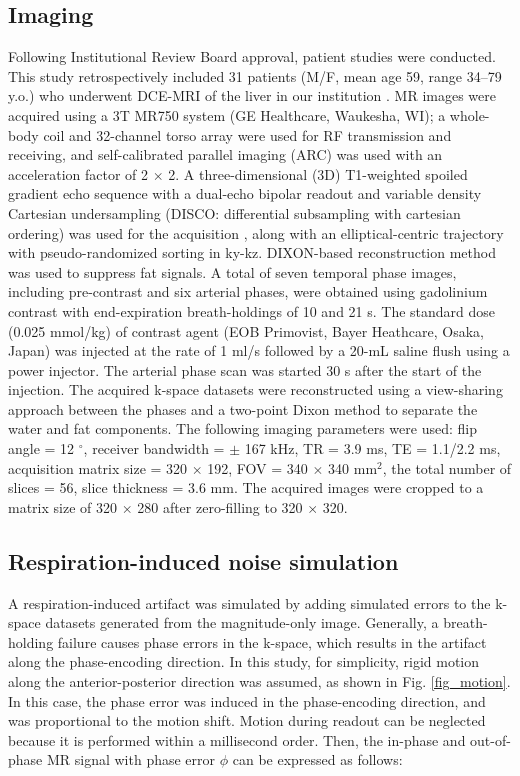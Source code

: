 \documentclass[num-refs]{wiley-article}
\begin{document}
\subsection{Imaging}

Following Institutional Review Board approval, patient studies were conducted. This study retrospectively included 31 patients (M/F, mean age 59, range 34–79 y.o.) who underwent DCE-MRI of the liver in our institution . MR images were acquired using a 3T MR750 system (GE Healthcare, Waukesha, WI); a whole-body coil and 32-channel torso array were used for RF transmission and receiving, and self-calibrated parallel imaging (ARC) was used with an acceleration factor of 2 $\times$ 2. A three-dimensional (3D) T1-weighted spoiled gradient echo sequence with a dual-echo bipolar readout and variable density Cartesian undersampling (DISCO: differential subsampling with cartesian ordering) was used for the acquisition \cite{saranathan2012differential}, along with an elliptical-centric trajectory with pseudo-randomized sorting in ky-kz. DIXON-based reconstruction method was used to suppress fat signals\cite{reeder2004multicoil}. A total of seven temporal phase images, including pre-contrast and six arterial phases, were obtained using gadolinium contrast with end-expiration breath-holdings of 10 and 21 s. The standard dose (0.025 mmol/kg) of contrast agent (EOB Primovist, Bayer Heathcare, Osaka, Japan) was injected at the rate of 1 ml/s followed by a 20-mL saline flush using a power injector. The arterial phase scan was started 30 s after the start of the injection. The acquired k-space datasets were reconstructed using a view-sharing approach between the phases and a two-point Dixon method to separate the water and fat components. The following imaging parameters were used: flip angle = 12 $^\circ$, receiver bandwidth = $\pm$ 167 kHz, TR = 3.9 ms, TE = 1.1/2.2 ms, acquisition matrix size = 320 $\times$ 192, FOV = 340 $\times$ 340 mm$^2$, the total number of slices = 56, slice thickness = 3.6 mm. The acquired images were cropped to a matrix size of 320 $\times$ 280 after zero-filling to 320 $\times$ 320.

\subsection{Respiration-induced noise simulation}\label{sec_resp_sim}

A respiration-induced artifact was simulated by adding simulated errors to the k-space datasets generated from the magnitude-only image. Generally, a breath-holding failure causes phase errors in the k-space, which results in the artifact along the phase-encoding direction. In this study, for simplicity, rigid motion along the anterior-posterior direction was assumed, as shown in Fig. \ref{fig_motion}. In this case, the phase error was induced in the phase-encoding direction, and was proportional to the motion shift. Motion during readout can be neglected because it is performed within a millisecond order.  Then, the in-phase and out-of-phase MR signal with phase error $\phi$ can be expressed as follows:
\end{document}
